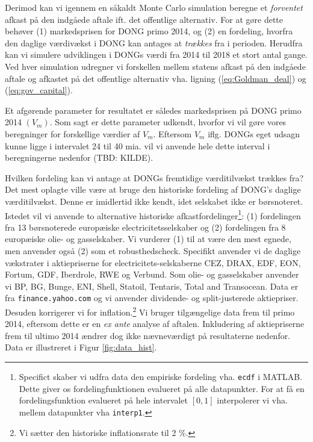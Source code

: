 \documentclass{article}
\begin{document}
Derimod kan vi igennem en såkaldt Monte Carlo simulation beregne et \emph{forventet} afkast på den indgåede aftale ift. det offentlige alternativ. For at gøre dette behøver (1) markedsprisen for DONG primo 2014, og (2) en fordeling, hvorfra den daglige værdivækst i DONG kan antages at \emph{trækkes} fra i perioden. Herudfra kan vi simulere udviklingen i DONGs værdi fra 2014 til 2018 et stort antal gange. Ved hver simulation udregner vi forskellen mellem statens afkast på den indgåede aftale og afkastet på det offentlige alternativ vha. ligning (\ref{eq:Goldman_deal}) og (\ref{eq:gov_capital}).

Et afgørende parameter for resultatet er således markedsprisen på DONG primo 2014 $(V_m)$. Som sagt er dette parameter udkendt, hvorfor vi vil gøre vores beregninger for forskellige værdier af $V_m$. Eftersom $V_m$ iflg. DONGs eget udsagn kunne ligge i intervalet 24 til 40 mia. vil vi anvende hele dette interval i beregningerne nedenfor (TBD: KILDE).


Hvilken fordeling kan vi antage at DONGs fremtidige værditilvækst trækkes fra? Det mest oplagte ville være at bruge den historiske fordeling af DONG's daglige værditilvækst. Denne er imidlertid ikke kendt, idet selskabet ikke er børsnoteret. Istedet vil vi anvende to alternative historiske afkastfordelinger\footnote{Specifict skaber vi udfra data den empiriske fordeling vha. \texttt{ecdf} i MATLAB. Dette giver os fordelingfunktionen evalueret på alle datapunkter. For at få en fordelingsfunktion evalueret på hele intervalet $[0,1]$ interpolerer vi vha. mellem datapunkter vha \texttt{interp1}.}: (1)  fordelingen fra 13 børsnoterede europæiske electricitetsselskaber og (2) fordelingen fra 8 europæiske olie- og gasselskaber. Vi vurderer (1) til at være den mest egnede, men anvender også (2) som et robusthedscheck. Specifikt anvender vi de daglige vækstrater i aktiepriserne for electricitets-selskaberne CEZ, DRAX, EDF, EON, Fortum, GDF, Iberdrole, RWE og Verbund. Som olie- og gasselskaber anvender vi BP, BG, Bunge, ENI, Shell, Statoil, Tentaris, Total and Transocean. Data er fra \texttt{finance.yahoo.com} og vi anvender dividende- og split-justerede aktiepriser. Desuden korrigerer vi for inflation.\footnote{Vi sætter den historiske inflationsrate til 2 \%.} Vi bruger tilgængelige data frem til primo 2014, eftersom dette er en \emph{ex ante} analyse af aftalen. Inkludering af aktiepriserne frem til ultimo 2014 ændrer dog ikke nævneværdigt på resultaterne nedenfor. Data er illustreret i Figur \ref{fig:data_hist}.
\end{document}
